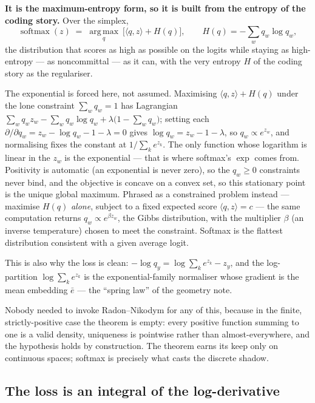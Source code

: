 \documentclass[11pt]{article}
\begin{document}
\textbf{It is the maximum-entropy form, so it is built from the entropy of the coding story.}
Over the simplex,
\[
  \operatorname{softmax}(z) \;=\; \operatorname*{arg\,max}_{q}\ \bigl[\langle q, z\rangle + H(q)\bigr],
  \qquad H(q) = -\sum_w q_w \log q_w,
\]
the distribution that scores as high as possible on the logits while staying as high-entropy
--- as noncommittal --- as it can, with the very entropy $H$ of the coding story as the
regulariser.

The exponential is forced here, not assumed. Maximising $\langle q, z\rangle + H(q)$ under the
lone constraint $\sum_w q_w = 1$ has Lagrangian $\sum_w q_w z_w - \sum_w q_w \log q_w +
\lambda\bigl(1 - \sum_w q_w\bigr)$; setting each $\partial/\partial q_w = z_w - \log q_w - 1 -
\lambda = 0$ gives $\log q_w = z_w - 1 - \lambda$, so $q_w \propto e^{z_w}$, and normalising
fixes the constant at $1/\sum_k e^{z_k}$. The only function whose logarithm is linear in the
$z_w$ is the exponential --- that is where softmax's $\exp$ comes from. Positivity is automatic
(an exponential is never zero), so the $q_w \ge 0$ constraints never bind, and the objective is
concave on a convex set, so this stationary point is the unique global maximum. Phrased as a
constrained problem instead --- maximise $H(q)$ \emph{alone}, subject to a fixed expected score
$\langle q, z\rangle = c$ --- the same computation returns $q_w \propto e^{\beta z_w}$, the
Gibbs distribution, with the multiplier $\beta$ (an inverse temperature) chosen to meet the
constraint. Softmax is the flattest distribution consistent with a given average logit.

This is also why the loss is clean: $-\log q_y = \log\sum_k e^{z_k} - z_y$, and
the log-partition $\log\sum_k e^{z_k}$ is the exponential-family normaliser whose gradient is
the mean embedding $\bar e$ --- the ``spring law'' of the geometry note.

Nobody needed to invoke Radon--Nikodym for any of this, because in the finite,
strictly-positive case the theorem is empty: every positive function summing to one is a valid
density, uniqueness is pointwise rather than almost-everywhere, and the hypothesis holds by
construction. The theorem earns its keep only on continuous spaces; softmax is precisely what
casts the discrete shadow.

\subsection*{The loss is an integral of the log-derivative}
\end{document}
